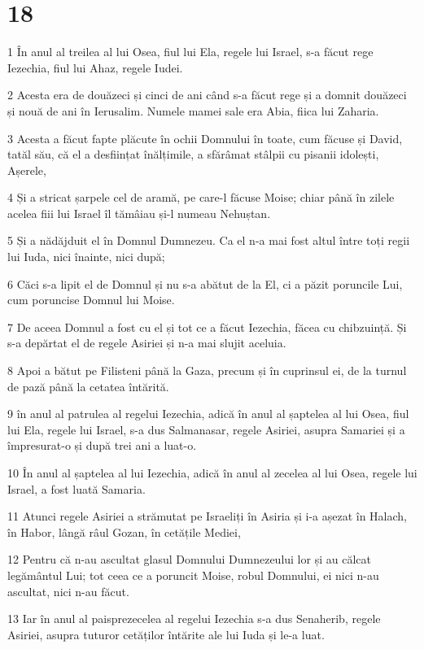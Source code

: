 \chapter{18}

\par 1 În anul al treilea al lui Osea, fiul lui Ela, regele lui Israel, s-a făcut rege Iezechia, fiul lui Ahaz, regele Iudei.
\par 2 Acesta era de douăzeci și cinci de ani când s-a făcut rege și a domnit douăzeci și nouă de ani în Ierusalim. Numele mamei sale era Abia, fiica lui Zaharia.
\par 3 Acesta a făcut fapte plăcute în ochii Domnului în toate, cum făcuse și David, tatăl său, că el a desființat înălțimile, a sfărâmat stâlpii cu pisanii idolești, Așerele,
\par 4 Și a stricat șarpele cel de aramă, pe care-l făcuse Moise; chiar până în zilele acelea fiii lui Israel îl tămâiau și-l numeau Nehuștan.
\par 5 Și a nădăjduit el în Domnul Dumnezeu. Ca el n-a mai fost altul între toți regii lui Iuda, nici înainte, nici după;
\par 6 Căci s-a lipit el de Domnul și nu s-a abătut de la El, ci a păzit poruncile Lui, cum poruncise Domnul lui Moise.
\par 7 De aceea Domnul a fost cu el și tot ce a făcut Iezechia, făcea cu chibzuință. Și s-a depărtat el de regele Asiriei și n-a mai slujit aceluia.
\par 8 Apoi a bătut pe Filisteni până la Gaza, precum și în cuprinsul ei, de la turnul de pază până la cetatea întărită.
\par 9 în anul al patrulea al regelui Iezechia, adică în anul al șaptelea al lui Osea, fiul lui Ela, regele lui Israel, s-a dus Salmanasar, regele Asiriei, asupra Samariei și a împresurat-o și după trei ani a luat-o.
\par 10 În anul al șaptelea al lui Iezechia, adică în anul al zecelea al lui Osea, regele lui Israel, a fost luată Samaria.
\par 11 Atunci regele Asiriei a strămutat pe Israeliți în Asiria și i-a așezat în Halach, în Habor, lângă râul Gozan, în cetățile Mediei,
\par 12 Pentru că n-au ascultat glasul Domnului Dumnezeului lor și au călcat legământul Lui; tot ceea ce a poruncit Moise, robul Domnului, ei nici n-au ascultat, nici n-au făcut.
\par 13 Iar în anul al paisprezecelea al regelui Iezechia s-a dus Senaherib, regele Asiriei, asupra tuturor cetăților întărite ale lui Iuda și le-a luat.
